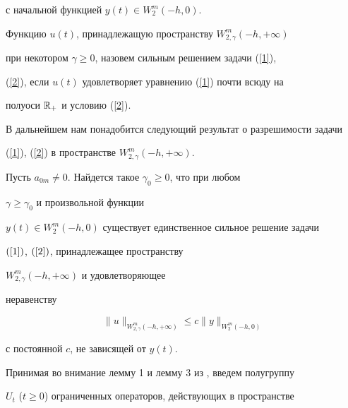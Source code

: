 с начальной функцией $y(t)\in W^m_2(-h,0)$. 


 


\begin{defnnonum} 


Функцию $u(t)$, принадлежащую пространству $W^m_{2,\gamma}(-h,+\infty)$ 


при некотором $\gamma\ge 0$, назовем сильным решением задачи (\ref{1}), 


(\ref{2}), если $u(t)$ удовлетворяет уравнению (\ref{1}) почти всюду на 


полуоси $\Bbb R_+$ и условию (\ref{2}). 


\end{defnnonum} 


 


В дальнейшем нам понадобится следующий результат о разрешимости задачи 


(\ref{1}), (\ref{2}) в пространстве $W^m_{2,\gamma}(-h,+\infty)$. 


 


\begin{lem} 


Пусть $a_{0m}\ne 0$. Найдется такое $\gamma_0\ge 0$, что при любом 


$\gamma\ge\gamma_0$ и произвольной функции 


$y(t)\in W^m_2(-h,0)$ существует единственное сильное решение задачи 


$(\ref{1})$, $(\ref{2})$, принадлежащее пространству 


$W^m_{2,\gamma}(-h,+\infty)$ и удовлетворяющее 


неравенству 


\begin{equation} 


\label{3} 


\|u\|_{W^m_{2,\gamma}(-h,+\infty)}\le c\|y\|_{W^m_2(-h,0)} 


\end{equation} 


с постоянной $c$, не зависящей от $y(t)$. 


\end{lem} 


 


Принимая во внимание лемму 1 и лемму 3 из \cite{1}, введем полугруппу 


$U_t$ ($t\ge 0$) ограниченных операторов, действующих в пространстве 


